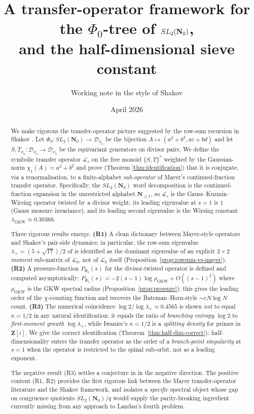 ﻿\documentclass[11pt]{article}
\title{A transfer-operator framework for the $\Phi_0$-tree of $\SLNz$,\\
and the half-dimensional sieve constant}
\author{Working note in the style of Shakov}
\date{April 2026}
\theoremstyle{definition}
\newcommand{\Nz}{\mathbf{N}_0}
\newcommand{\Z}{\mathbf{Z}}
\newcommand{\SLNz}{SL_2(\Nz)}
\newcommand{\Dphi}{\mathcal{D}_{\phi_0}}
\newcommand{\Phio}{\Phi_0}
\newcommand{\Lop}{\mathcal{L}}
\newcommand{\GKW}{\mathrm{GKW}}
\begin{document}
\maketitle

\begin{abstract}
We make rigorous the transfer-operator picture suggested by the row-sum recursion in Shakov \cite{shakov2024}. Let $\Phio:\SLNz\to\Dphi$ be the bijection $A\mapsto(a^2+b^2,ac+bd)$ and let $\bar S,\bar T_{\phi_0}:\Dphi\to\Dphi$ be the equivariant generators on divisor pairs. We define the symbolic transfer operator $\Lop_s$ on the free monoid $\{S,T\}^*$ weighted by the Gaussian-norm $\chi_1(A)=a^2+b^2$ and prove (Theorem \ref{thm:identification}) that it is conjugate, via a renormalisation, to a finite-alphabet \emph{sub-operator} of Mayer's continued-fraction transfer operator. Specifically, the $\SLNz$ word decomposition is the continued-fraction expansion in the unrestricted alphabet $\mathbf{N}_{\ge 1}$, so $\Lop_s$ is the Gauss--Kuzmin--Wirsing operator twisted by a divisor weight; its leading eigenvalue at $s=1$ is $1$ (Gauss measure invariance), and its leading second eigenvalue is the Wirsing constant $\lambda_{\GKW}\approx 0.30366$.

Three rigorous results emerge.
\textbf{(R1)} A clean dictionary between Mayer-style operators and Shakov's pair-side dynamics; in particular, the row-sum eigenvalue $\lambda_+=(5+\sqrt{17})/2$ of \cite{shakov2024} is identified as the dominant eigenvalue of an explicit $2\times 2$ \emph{moment} sub-matrix of $\Lop_0$, not of $\Lop_0$ itself (Proposition~\ref{prop:rowsum-vs-mayer}).
\textbf{(R2)} A pressure-function $P_{\Phio}(s)$ for the divisor-twisted operator is defined and computed asymptotically: $P_{\Phio}(s) = -2(s-1)\log\rho_\GKW + O((s-1)^2)$ where $\rho_\GKW$ is the GKW spectral radius (Proposition~\ref{prop:pressure}); this gives the leading order of the $\chi$-counting function and recovers the Bateman--Horn-style $\sim cN\log N$ count.
\textbf{(R3)} The numerical coincidence $\log 2/\log\lambda_+\approx 0.4565$ is shown \emph{not} to equal $\kappa=1/2$ in any natural identification: it equals the ratio of \emph{branching entropy} $\log 2$ to \emph{first-moment growth} $\log\lambda_+$, while Iwaniec's $\kappa=1/2$ is a \emph{splitting density} for primes in $\Z[i]$. We give the correct identification (Theorem~\ref{thm:half-dim-correct}): half-dimensionality enters the transfer operator as the order of a \emph{branch-point singularity} at $s=1$ when the operator is restricted to the spinal sub-orbit, not as a leading exponent.

The negative result (R3) settles a conjecture in \cite[B7]{shakovnotes} in the negative direction. The positive content (R1, R2) provides the first rigorous link between the Mayer transfer-operator literature and the Shakov framework, and isolates a \emph{specific} spectral object whose gap on congruence quotients $\SLNz/q$ would supply the parity-breaking ingredient currently missing from any approach to Landau's fourth problem.
\end{abstract}
\end{document}
